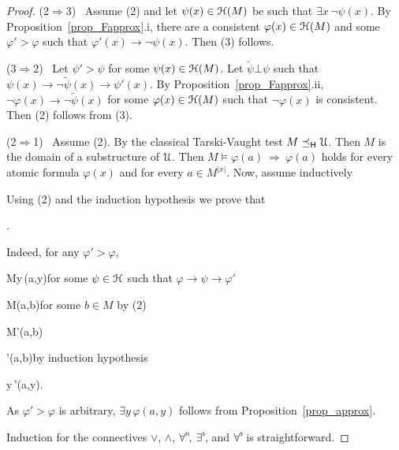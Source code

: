 \documentclass{amsproc}
\begin{document}
{\begin{proof}
  (2$\Rightarrow$3) \ 
  Assume (2) and let $\psi(x)\in{\EuScript H}(M)$ be such that $\exists x\,\neg\psi(x)$.
  By Proposition~\ref{prop_Fapprox}.i, there are a consistent $\varphi(x)\in{\EuScript H}(M)$ and some $\varphi'>\varphi$ such that $\varphi'(x)\rightarrow\neg\psi(x)$.
  Then (3) follows.

  (3$\Rightarrow$2) \ 
  Let $\psi'>\psi$ for some $\psi(x)\in{\EuScript H}(M)$.
  Let $\tilde{\psi}\bot\psi$ such that $\psi(x)\rightarrow\neg\tilde{\psi}(x)\rightarrow\psi'(x)$.
  By Proposition~\ref{prop_Fapprox}.ii, $\neg\varphi(x)\rightarrow\neg\tilde{\psi}(x)$ for some $\varphi(x)\in{\EuScript H}(M)$ such that $\neg\varphi(x)$ is consistent.
  Then (2) follows from (3).
  
  (2$\Rightarrow$1) \ 
  Assume (2).
  By the classical Tarski-Vaught test $M\preceq_{\sf H}{\EuScript U}$.
  Then $M$ is the domain of a substructure of ${\EuScript U}$.
  Then $M\models\varphi(a)\ \Rightarrow\ \varphi(a)$ holds for every atomic formula $\varphi(x)$ and for every $a\in M^{|x|}$.
  Now, assume inductively
  
  \ceq{\hfill M\models\varphi(a,b)}{\Rightarrow}{\varphi(a,b).}

  Using (2) and the induction hypothesis we prove that

  .

  Indeed, for any $\varphi'>\varphi$,

  {\Rightarrow}{M\models\exists y\,\psi(a,y)}\hfill for some $\psi\in{\EuScript H}$ such that $\varphi\rightarrow\psi\rightarrow\varphi'$
  
  \ceq{}
  {\Rightarrow}
  {M\models\psi(a,b)}\hfill for some $b\in M$ by (2)
  
  \ceq{}
  {\Rightarrow}
  {M\models\varphi'(a,b)}
  
  \ceq{}
  {\Rightarrow}
  {\varphi'(a,b)}\hfill by induction hypothesis

  \ceq{}
  {\Rightarrow}
  {\exists y\,\varphi'(a,y).}

  As $\varphi'>\varphi$ is arbitrary, $\exists y\,\varphi(a,y)$ follows from Proposition~\ref{prop_approx}.

  Induction for the connectives $\vee$, $\wedge$, $\forall\raisebox{1.1ex}{\scaleto{\sf H}{.8ex}\kern-.2ex}$, $\exists\raisebox{1.1ex}{\scaleto{\sf S}{.8ex}\kern-.2ex}$, and $\forall\raisebox{1.1ex}{\scaleto{\sf S}{.8ex}\kern-.2ex}$ is straightforward.


\end{proof}}
\end{document}
